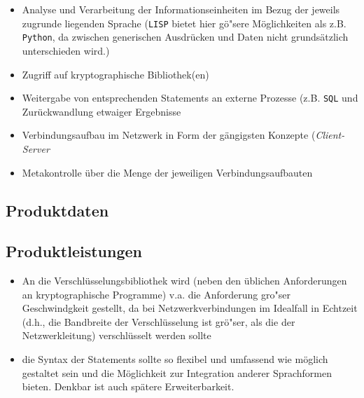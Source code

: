 \begin{itemize}
  
\item Analyse und Verarbeitung der Informationseinheiten im Bezug der
  jeweils zugrunde liegenden Sprache (\texttt{LISP} bietet hier
  g\"o"sere M\"oglichkeiten als z.B. \texttt{Python}, da zwischen
  generischen Ausdr\"ucken und Daten nicht grunds\"atzlich
  unterschieden wird.)
  
\item Zugriff auf kryptographische Bibliothek(en)
  
\item Weitergabe von entsprechenden Statements an externe Prozesse
  (z.B.  \texttt{SQL} und Zur\"uckwandlung etwaiger Ergebnisse
  
\item Verbindungsaufbau im Netzwerk in Form der g\"angigsten Konzepte
  (\textit{Client-Server}
  
\item Metakontrolle \"uber die Menge der jeweiligen
  Verbindungsaufbauten

\end{itemize}

\subsection{Produktdaten}

\subsection{Produktleistungen}

\begin{itemize}
  
\item An die Verschl\"usselungsbibliothek wird (neben den \"ublichen
  Anforderungen an kryptographische Programme) v.a. die Anforderung
  gro"ser Geschwindgkeit gestellt, da bei Netzwerkverbindungen im
  Idealfall in Echtzeit (d.h., die Bandbreite der Verschl\"usselung
  ist gr\"o"ser, als die der Netzwerkleitung) verschl\"usselt werden
  sollte

\item die Syntax der Statements sollte so flexibel und umfassend wie
  m\"oglich gestaltet sein und die M\"oglichkeit zur Integration
  anderer Sprachformen bieten. Denkbar ist auch sp\"atere
  Erweiterbarkeit.

\end{itemize} 

